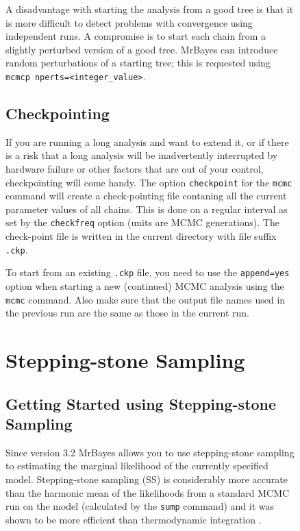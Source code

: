 \documentclass[12pt]{book}
\newcommand{\ttt}[1]{\texttt{#1}}
\begin{document}
\begin{figure}[h]
A disadvantage with starting the analysis from a good tree is that it is more difficult to detect
problems with convergence using independent runs. A compromise is to start each chain from a
slightly perturbed version of a good tree. MrBayes can introduce random perturbations of a starting
tree; this is requested using \ttt{mcmcp nperts=<integer\_value>}.

\subsection{Checkpointing}
\label{checkpointing}

If you are running a long analysis and want to extend it, or if there is a risk that a long
analysis will be inadvertently interrupted by hardware failure or other factors that are out of
your control, checkpointing will come handy. The option \ttt{checkpoint} for the \ttt{mcmc} command
will create a check-pointing file contaning all the current parameter values of all chains. This
is done on a regular interval as set by the \ttt{checkfreq} option (units are MCMC generations).
The check-point file is written in the current directory with file suffix \ttt{.ckp}.

To start from an existing \ttt{.ckp} file, you need to use the \ttt{append=yes} option when
starting a new (continued) MCMC analysis using the \ttt{mcmc} command. Also make sure that the
output file names used in the previous run are the same as those in the current run.

\section{Stepping-stone Sampling}

\subsection{Getting Started using Stepping-stone Sampling}

Since version 3.2 MrBayes allows you to use stepping-stone sampling \citep{xie11} to estimating the
marginal likelihood of the currently specified model. Stepping-stone sampling (SS) is considerably
more accurate than the harmonic mean of the likelihoods from a standard MCMC run on the model
(calculated by the \ttt{sump} command) and it was shown to be more efficient than thermodynamic
integration \citep{xie11}.


\end{figure}
\end{document}
